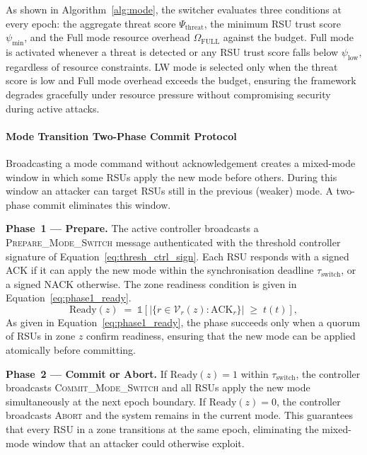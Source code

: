 As shown in Algorithm~\ref{alg:mode}, the switcher
evaluates three conditions at every epoch: the aggregate
threat score $\Psi_{\mathrm{threat}}$, the minimum RSU
trust score $\psi_{\min}$, and the Full mode resource
overhead $\Omega_{\mathrm{FULL}}$ against the budget.
Full mode is activated whenever a threat is detected or
any RSU trust score falls below $\psi_{\mathrm{low}}$,
regardless of resource constraints. LW mode is selected
only when the threat score is low and Full mode overhead
exceeds the budget, ensuring the framework degrades
gracefully under resource pressure without compromising
security during active attacks.


\paragraph{Mode Transition Two-Phase Commit Protocol}
\label{sec:mode_transition}

Broadcasting a mode command without acknowledgement creates a
mixed-mode window in which some RSUs apply the new mode before
others. During this window an attacker can target RSUs still in
the previous (weaker) mode. A two-phase commit eliminates this
window.

\textbf{Phase~1 --- Prepare.} The active controller broadcasts a
\textsc{Prepare\_Mode\_Switch} message authenticated with the
threshold controller signature of
Equation~\eqref{eq:thresh_ctrl_sign}.
Each RSU responds with a signed \textsc{ACK} if it can apply the
new mode within the synchronisation deadline $\tau_{\mathrm{switch}}$,
or a signed \textsc{NACK} otherwise. The zone readiness condition
is given in Equation~\eqref{eq:phase1_ready}.
%
\begin{equation}
  \mathrm{Ready}(z) \;=\;
    \mathbb{1}\!\left[
      \bigl|\{r \in \mathcal{V}_r(z) : \mathrm{ACK}_r\}\bigr|
      \;\geq\; t(t)
    \right],
  \label{eq:phase1_ready}
\end{equation}
%
As given in Equation~\eqref{eq:phase1_ready}, the phase succeeds
only when a quorum of RSUs in zone $z$ confirm readiness, ensuring
that the new mode can be applied atomically before committing.

\textbf{Phase~2 --- Commit or Abort.} If $\mathrm{Ready}(z)=1$
within $\tau_{\mathrm{switch}}$, the controller broadcasts
\textsc{Commit\_Mode\_Switch} and all RSUs apply the new mode
simultaneously at the next epoch boundary. If $\mathrm{Ready}
(z)=0$, the controller broadcasts \textsc{Abort} and the system
remains in the current mode. This guarantees that every RSU in
a zone transitions at the same epoch, eliminating the mixed-mode
window that an attacker could otherwise exploit.


